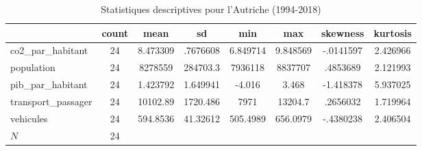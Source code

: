 


\begin{table}[H]
    \centering
\def\sym#1{\ifmmode^{#1}\else\(^{#1}\)\fi}
    \footnotesize{
\begin{tabular}{|l*{1}{|ccccccc|}}
\hline
            &       count&        mean&          sd&         min&         max&    skewness&    kurtosis\\
\hline
co2\_par\_habitant&          24&    8.473309&    .7676608&    6.849714&    9.848569&   -.0141597&    2.426966\\
population  &          24&     8278559&    284703.3&     7936118&     8837707&    .4853689&    2.121993\\
pib\_par\_habitant&          24&    1.423792&    1.649941&      -4.016&       3.468&   -1.418378&    5.937025\\
transport\_passager&          24&    10102.89&    1720.486&        7971&     13204.7&    .2656032&    1.719964\\
vehicules   &          24&    594.8536&    41.32612&    505.4989&    656.0979&   -.4380238&    2.406504\\
\hline
\(N\)       &          24&            &            &            &            &            &            \\
\hline
\end{tabular}
}
    \caption{Statistiques descriptives pour l'Autriche (1994-2018)}
    \label{tab:Autriche}
\end{table}


\vspace*{0.5cm}

